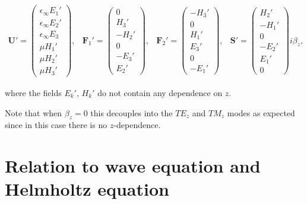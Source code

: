 \begin{equation*}
\begin{array}{ccccc}
\mathbf{U}' = \begin{pmatrix} \epsilon_{\infty} E_1' \\ \epsilon_{\infty} E_2' \\ \epsilon_{\infty} E_3 \\ \mu H_1' \\ \mu H_2' \\  \mu H_3'  \end{pmatrix} ,
&
\mathbf{F}_1' = \begin{pmatrix} 0 \\ H_3' \\ -H_2' \\ 0 \\ -E_3' \\ E_2'  \end{pmatrix} ,
&
\mathbf{F}_2' = \begin{pmatrix} - H_3' \\ 0 \\ H_1' \\ E_3' \\ 0 \\ -E_1' \end{pmatrix} ,
&
\mathbf{S}' = \begin{pmatrix} H_2' \\ -H_1' \\ 0 \\ -E_2' \\ E_1' \\ 0 \end{pmatrix} i \beta_z ,
\end{array}
\:
\end{equation*}

where the fields $E_k'$, $H_k'$ do not contain any dependence on $z$.

Note that when $\beta_z = 0$ this decouples into the $TE_z$ and $TM_z$ modes as expected since in this case there is no $z$-dependence.

\section{Relation to wave equation and Helmholtz equation}
